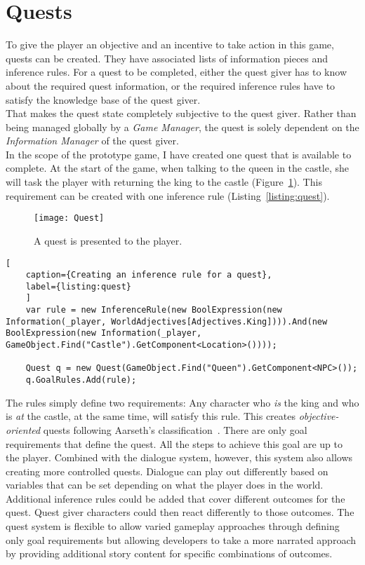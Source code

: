 \section{Quests}
To give the player an objective and an incentive to take action in this game, quests can be created. They have associated lists of information pieces and inference rules. For a quest to be completed, either the quest giver has to know about the required quest information, or the required inference rules have to satisfy the knowledge base of the quest giver.\\
That makes the quest state completely subjective to the quest giver. Rather than being managed globally by a \textit{Game Manager}, the quest is solely dependent on the \textit{Information Manager} of the quest giver.\\
In the scope of the prototype game, I have created one quest that is available to complete. At the start of the game, when talking to the queen in the castle, she will task the player with returning the king to the castle (Figure~\ref{fig:quest}). This requirement can be created with one inference rule (Listing~\ref{listing:quest}).
\begin{figure}
	\centering
	\texttt{[image: Quest]}
	\caption{A quest is presented to the player.}
	\label{fig:quest}
\end{figure}
\begin{lstlisting}[
	caption={Creating an inference rule for a quest},
	label={listing:quest}
	]
	var rule = new InferenceRule(new BoolExpression(new Information(_player, WorldAdjectives[Adjectives.King]))).And(new BoolExpression(new Information(_player, GameObject.Find("Castle").GetComponent<Location>())));
	
	Quest q = new Quest(GameObject.Find("Queen").GetComponent<NPC>());
	q.GoalRules.Add(rule);
\end{lstlisting}
The rules simply define two requirements: Any character who \textit{is} the king and who is \textit{at} the castle, at the same time, will satisfy this rule. This creates \textit{objective-oriented} quests following Aarseth's classification~\cite{Aarseth2005}. There are only goal requirements that define the quest. All the steps to achieve this goal are up to the player. Combined with the dialogue system, however, this system also allows creating more controlled quests. Dialogue can play out differently based on variables that can be set depending on what the player does in the world. Additional inference rules could be added that cover different outcomes for the quest. Quest giver characters could then react differently to those outcomes. The quest system is flexible to allow varied gameplay approaches through defining only goal requirements but allowing developers to take a more narrated approach by providing additional story content for specific combinations of outcomes.
